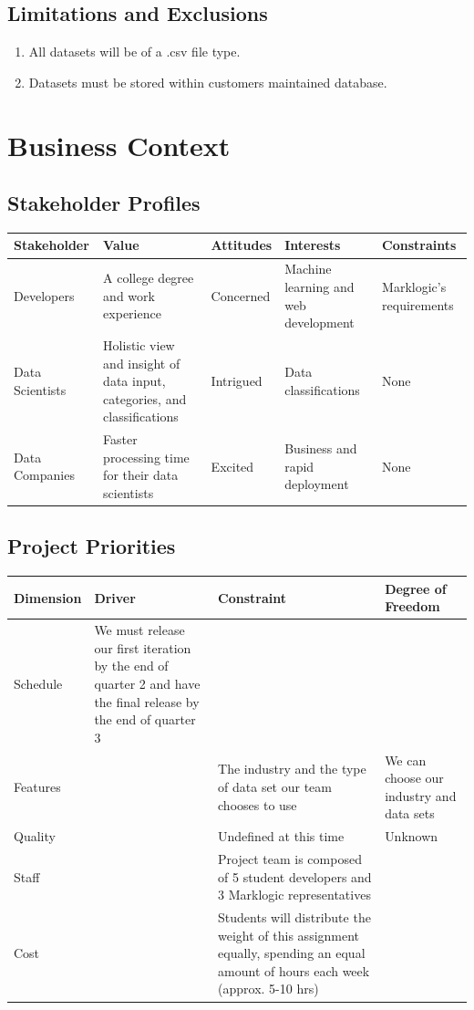 \documentclass[12pt,oneside,letterpaper]{article}
\begin{document}
\subsection{Limitations and Exclusions}
\begin{enumerate}
    \item All datasets will be of a .csv file type.
    \item Datasets must be stored within customers maintained database.
\end{enumerate}




\section{Business Context}
\subsection{Stakeholder Profiles}
\begin{tabular}{|l|p{1in}|p{1in}|p{1in}|p{1in}|}
\hline
\textbf{Stakeholder}&\textbf{Value}&\textbf{Attitudes}&\textbf{Interests}&\textbf{Constraints}\\
\hline
Developers&A college degree and work experience&Concerned&Machine learning and web development&Marklogic's requirements\\
\hline
Data Scientists&Holistic view and insight of data input, categories, and classifications &Intrigued&Data classifications&None\\
\hline
Data Companies&Faster processing time for their data scientists&Excited&Business and rapid deployment&None\\
\hline
\end{tabular}
\subsection{Project Priorities}
\begin{tabular}{|p{0.9in}|p{1.4in}|p{1.4in}|p{1.6in}|}
\hline
\textbf{Dimension}&\textbf{Driver}&\textbf{Constraint}&\textbf{Degree of Freedom}\\
\hline
Schedule&We must release our first iteration by the end of quarter 2 and have the final release by the end of quarter 3&&\\
\hline
Features&&The industry and the type of data set our team chooses to use&We can choose our industry and data sets\\
\hline
Quality&&Undefined at this time&Unknown\\
\hline
Staff&&Project team is composed of 5 student developers and 3 Marklogic representatives&\\
\hline
Cost&&Students will distribute the weight of this assignment equally, spending an equal amount of hours each week (approx. 5-10 hrs) &\\
\hline
\end{tabular}
\end{document}
